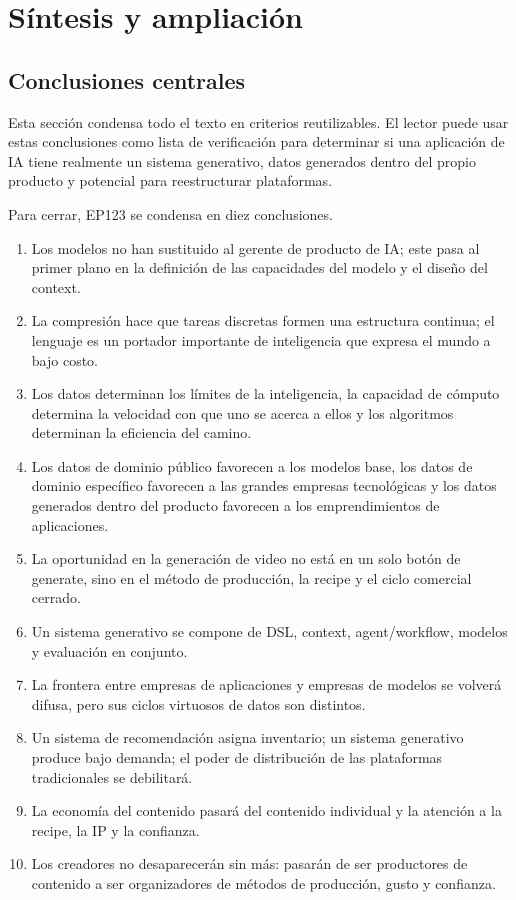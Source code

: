 \section{Síntesis y ampliación}

\subsection{Conclusiones centrales}

Esta sección condensa todo el texto en criterios reutilizables. El lector puede usar estas conclusiones como lista de verificación para determinar si una aplicación de IA tiene realmente un sistema generativo, datos generados dentro del propio producto y potencial para reestructurar plataformas.

Para cerrar, EP123 se condensa en diez conclusiones.

\begin{enumerate}
\item Los modelos no han sustituido al gerente de producto de IA; este pasa al primer plano en la definición de las capacidades del modelo y el diseño del context.
\item La compresión hace que tareas discretas formen una estructura continua; el lenguaje es un portador importante de inteligencia que expresa el mundo a bajo costo.
\item Los datos determinan los límites de la inteligencia, la capacidad de cómputo determina la velocidad con que uno se acerca a ellos y los algoritmos determinan la eficiencia del camino.
\item Los datos de dominio público favorecen a los modelos base, los datos de dominio específico favorecen a las grandes empresas tecnológicas y los datos generados dentro del producto favorecen a los emprendimientos de aplicaciones.
\item La oportunidad en la generación de video no está en un solo botón de generate, sino en el método de producción, la recipe y el ciclo comercial cerrado.
\item Un sistema generativo se compone de DSL, context, agent/workflow, modelos y evaluación en conjunto.
\item La frontera entre empresas de aplicaciones y empresas de modelos se volverá difusa, pero sus ciclos virtuosos de datos son distintos.
\item Un sistema de recomendación asigna inventario; un sistema generativo produce bajo demanda; el poder de distribución de las plataformas tradicionales se debilitará.
\item La economía del contenido pasará del contenido individual y la atención a la recipe, la IP y la confianza.
\item Los creadores no desaparecerán sin más: pasarán de ser productores de contenido a ser organizadores de métodos de producción, gusto y confianza.
\end{enumerate}

